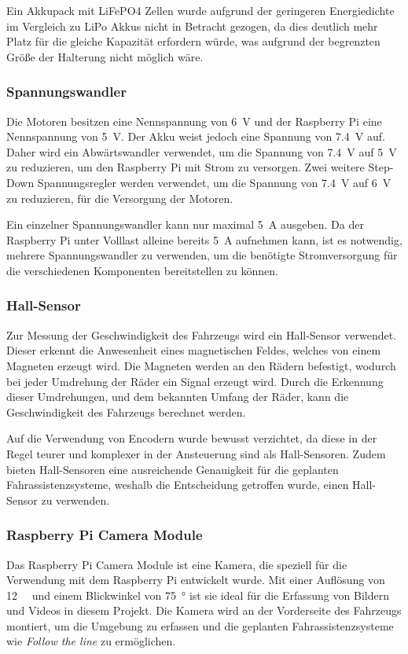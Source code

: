         Ein Akkupack mit \ac{LiFePO4} Zellen wurde aufgrund der geringeren Energiedichte im Vergleich zu \ac{LiPo} Akkus nicht in Betracht gezogen, da dies deutlich mehr Platz für die gleiche Kapazität erfordern würde, was aufgrund der begrenzten Größe der Halterung nicht möglich wäre.

        \subsubsection{Spannungswandler}
        Die Motoren besitzen eine Nennspannung von \SI{6}{\volt} und der Raspberry Pi eine Nennspannung von \SI{5}{\volt}. Der Akku weist jedoch eine Spannung von \SI{7,4}{\volt} auf. Daher wird ein Abwärtswandler verwendet, um die Spannung von \SI{7,4}{\volt} auf \SI{5}{\volt} zu reduzieren, um den Raspberry Pi mit Strom zu versorgen. Zwei weitere Step-Down Spannungsregler werden verwendet, um die Spannung von \SI{7,4}{\volt} auf \SI{6}{\volt} zu reduzieren, für die Versorgung der Motoren.

        Ein einzelner Spannungswandler kann nur maximal \SI{5}{\ampere} ausgeben. Da der Raspberry Pi unter Volllast alleine bereits \SI{5}{\ampere} aufnehmen kann, ist es notwendig, mehrere Spannungswandler zu verwenden, um die benötigte Stromversorgung für die verschiedenen Komponenten bereitstellen zu können.

        \subsubsection{Hall-Sensor}
        Zur Messung der Geschwindigkeit des Fahrzeugs wird ein Hall-Sensor verwendet. Dieser erkennt die Anwesenheit eines magnetischen Feldes, welches von einem Magneten erzeugt wird. Die Magneten werden an den Rädern befestigt, wodurch bei jeder Umdrehung der Räder ein Signal erzeugt wird. Durch die Erkennung dieser Umdrehungen, und dem bekannten Umfang der Räder, kann die Geschwindigkeit des Fahrzeugs berechnet werden. 

        Auf die Verwendung von Encodern wurde bewusst verzichtet, da diese in der Regel teurer und komplexer in der Ansteuerung sind als Hall-Sensoren. Zudem bieten Hall-Sensoren eine ausreichende Genauigkeit für die geplanten Fahrassistenzsysteme, weshalb die Entscheidung getroffen wurde, einen Hall-Sensor zu verwenden.

        \subsubsection{Raspberry Pi Camera Module}
        Das Raspberry Pi Camera Module ist eine Kamera, die speziell für die Verwendung mit dem Raspberry Pi entwickelt wurde. Mit einer Auflösung von \SI{12}{\mega\pixel} und einem Blickwinkel von \SI{75}{\degree} ist sie ideal für die Erfassung von Bildern und Videos in diesem Projekt. Die Kamera wird an der Vorderseite des Fahrzeugs montiert, um die Umgebung zu erfassen und die geplanten Fahrassistenzsysteme wie \emph{Follow the line} zu ermöglichen.

